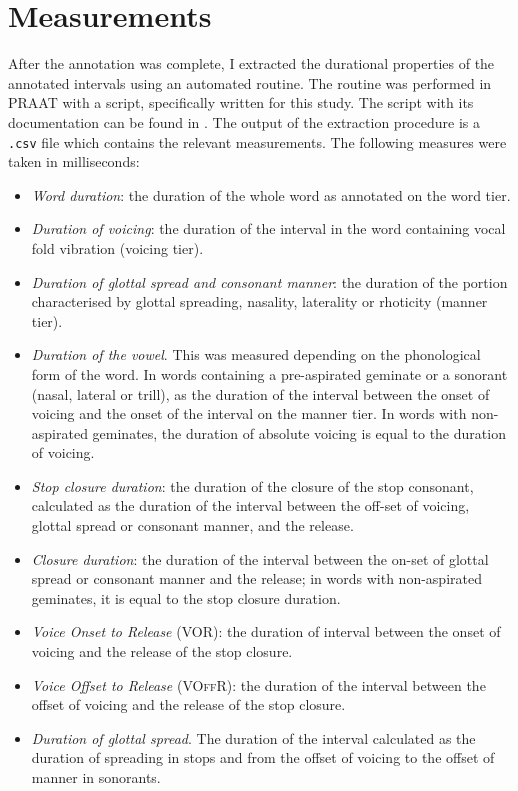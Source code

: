 \documentclass[11pt,a4paper,openany]{memoir}\usepackage[]{graphicx}\usepackage[]{color}
\begin{document}
\section{Measurements}
\label{s:measurements}
After the annotation was complete, I extracted the durational properties of the annotated intervals using an automated routine.
The routine was performed in PRAAT with a script, specifically written for this study.
The script with its documentation can be found in .
The output of the extraction procedure is a \texttt{.csv} file which contains the relevant measurements.
The following measures were taken in milliseconds:

\begin{itemize}
\item \textit{Word duration}: the duration of the whole word as annotated on the word tier.
\item \textit{Duration of voicing}: the duration of the interval in the word containing vocal fold vibration (voicing tier).
\item \textit{Duration of glottal spread and consonant manner}: the duration of the portion characterised by glottal spreading, nasality, laterality or rhoticity (manner tier).
\item \textit{Duration of the vowel}.
This was measured depending on the phonological form of the word.
In words containing a pre-aspirated geminate or a sonorant (nasal, lateral or trill), as the duration of the interval between the onset of voicing and the onset of the interval on the manner tier.
In words with non-aspirated geminates, the duration of absolute voicing is equal to the duration of voicing.
\item \textit{Stop closure duration}: the duration of the closure of the stop consonant, calculated as the duration of the interval between the off-set of voicing, glottal spread or consonant manner, and the release.
\item \textit{Closure duration}: the duration of the interval between the on-set of glottal spread or consonant manner and the release; in words with non-aspirated geminates, it is equal to the stop closure duration.
\item \textit{Voice Onset to Release} (VOR): the duration of interval between the onset of voicing and the release of the stop closure.
\item \textit{Voice Offset to Release} (\textsc{VOffR}): the duration of the interval between the offset of voicing and the release of the stop closure.
\item \textit{Duration of glottal spread}. The duration of the interval calculated as the duration of spreading in stops and from the offset of voicing to the offset of manner in sonorants.
\end{itemize}
\end{document}
